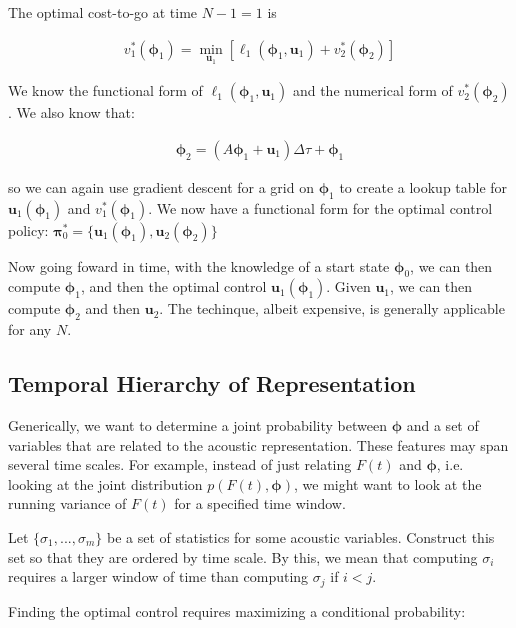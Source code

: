 \documentclass{article} %
\begin{document}
The optimal cost-to-go at time $N-1=1$ is

\begin{align*}
v^*_{1} \left( \bm{\phi}_{1} \right) = \min_{\bm{u}_{1}} \left[ \ell_1 \left( \bm{\phi}_{1}, \bm{u}_{1} \right) + v^*_2 \left( \bm{\phi}_2 \right) \right]
\end{align*}

We know the functional form of $\ell_1 \left( \bm{\phi}_{1}, \bm{u}_{1} \right)$ and the
numerical form of $v^*_2 \left( \bm{\phi}_2 \right)$. We also know that:

\begin{align*}
\bm{\phi}_2 = \left( A\bm{\phi}_1 + \bm{u}_1 \right) \Delta\tau + \bm{\phi}_1
\end{align*}

so we can again use gradient descent for a grid on $\bm{\phi}_1$ to create a lookup
table for $\bm{u}_1(\bm{\phi}_1)$ and $v^*_1 \left( \bm{\phi}_1 \right)$. We now have
a functional form for the optimal control policy: $\bm{\pi}_0^* = \{ \bm{u}_1(\bm{\phi}_1), \bm{u}_2(\bm{\phi}_2) \}$

Now going foward in time, with the knowledge of a start state $\bm{\phi}_0$, we can then
compute $\bm{\phi}_1$, and then the optimal control $\bm{u}_1 \left( \bm{\phi}_1 \right)$.
Given $\bm{u}_1$, we can then compute $\bm{\phi}_2$ and then $\bm{u}_2$. The techinque,
albeit expensive, is generally applicable for any $N$.


\subsection{Temporal Hierarchy of Representation}

Generically, we want to determine a joint probability between $\bm{\phi}$ and a set of
variables that are related to the acoustic representation. These features may span several
time scales. For example, instead of just relating $F(t)$ and $\bm{\phi}$, i.e. looking
at the joint distribution $p \left( F(t), \bm{\phi} \right)$, we might want to look
at the running variance of $F(t)$ for a specified time window.

Let $\{ \sigma_1, ..., \sigma_m \}$ be a set of statistics for some acoustic variables. Construct
this set so that they are ordered by time scale. By this, we mean that computing $\sigma_i$
requires a larger window of time than computing $\sigma_j$ if $i < j$.

Finding the optimal control requires maximizing a conditional probability:
\end{document}
